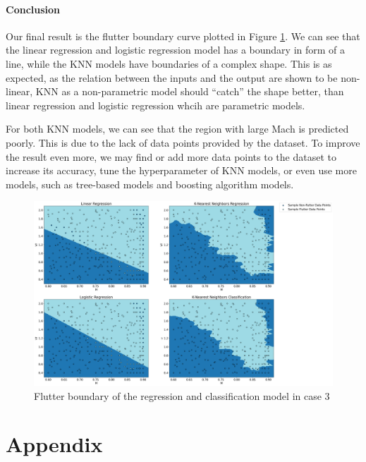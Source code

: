 \documentclass[conf]{new-aiaa}
\begin{document}
\paragraph{Conclusion} Our final result is the flutter boundary curve plotted in Figure \ref{fig:case3_boundary}. We can see that the linear regression and logistic regression model has a boundary in form of a line, while the KNN models have boundaries of a complex shape. This is as expected, as the relation between the inputs and the output are shown to be non-linear, KNN as a non-parametric model should ``catch'' the shape better, than linear regression and logistic regression whcih are parametric models.

For both KNN models, we can see that the region with large Mach is predicted poorly. This is due to the lack of data points provided by the dataset. To improve the result even more, we may find or add more data points to the dataset to increase its accuracy, tune the hyperparameter of KNN models, or even use more models, such as tree-based models and boosting algorithm models. 
\begin{figure}[H]
    \centering
    \includegraphics[width=1.0\textwidth]{graph/case3_boundary.png}
    \caption{Flutter boundary of the regression and classification model in case 3}
    \label{fig:case3_boundary}
\end{figure}

\section*{Appendix}
\end{document}
